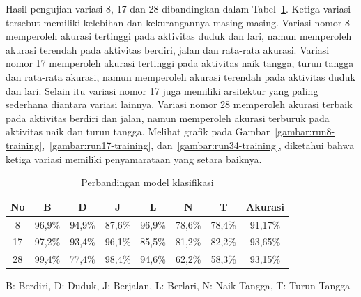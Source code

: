 Hasil pengujian variasi 8, 17 dan 28 dibandingkan dalam Tabel~\ref{table:perbandingan-model-klasifikasi}. Ketiga variasi tersebut memiliki kelebihan dan kekurangannya masing-masing. Variasi nomor 8 memperoleh akurasi tertinggi pada aktivitas duduk dan lari, namun memperoleh akurasi terendah pada aktivitas berdiri, jalan dan rata-rata akurasi. Variasi nomor 17 memperoleh akurasi tertinggi pada aktivitas naik tangga, turun tangga dan rata-rata akurasi, namun memperoleh akurasi terendah pada aktivitas duduk dan lari. Selain itu variasi nomor 17 juga memiliki arsitektur yang paling sederhana diantara variasi lainnya. Variasi nomor 28 memperoleh akurasi terbaik pada aktivitas berdiri dan jalan, namun memperoleh akurasi terburuk pada aktivitas naik dan turun tangga. Melihat grafik pada Gambar~\ref{gambar:run8-training},~\ref{gambar:run17-training}, dan~\ref{gambar:run34-training}, diketahui bahwa ketiga variasi memiliki penyamarataan yang setara baiknya.

\begin{table}[h!]
    \centering
    \caption{Perbandingan model klasifikasi}
    \begin{threeparttable}
        \begin{tabular}{ |c|c|c|c|c|c|c|c| }
            \hline
            No & B & D & J & L & N & T & Akurasi \\

            \hline
            8 & \cellcolor{red!10} 96,9\% & \cellcolor{teal!20}94,9\% & \cellcolor{red!10} 87,6\% & \cellcolor{teal!20} 96,9\% & 78,6\% & 78,4\% & \cellcolor{red!10} 91,17\% \\

            \hline
            17 & 97,2\% & \cellcolor{red!10} 93,4\% & 96,1\% & \cellcolor{red!10} 85,5\% & \cellcolor{teal!20} 81,2\% & \cellcolor{teal!20} 82,2\% & \cellcolor{teal!20} 93,65\% \\

            \hline
            28 & \cellcolor{teal!20} 99,4\% & 77,4\% & \cellcolor{teal!20} 98,4\% & 94,6\% & \cellcolor{red!10} 62,2\% & \cellcolor{red!10} 58,3\% & 93,15\% \\

            \hline
        \end{tabular}
        \begin{tablenotes}\footnotesize
            \item  B: Berdiri, D: Duduk, J: Berjalan, L: Berlari, N: Naik Tangga, T: Turun Tangga 
        \end{tablenotes}    
    \end{threeparttable}
    \label{table:perbandingan-model-klasifikasi}
\end{table}

